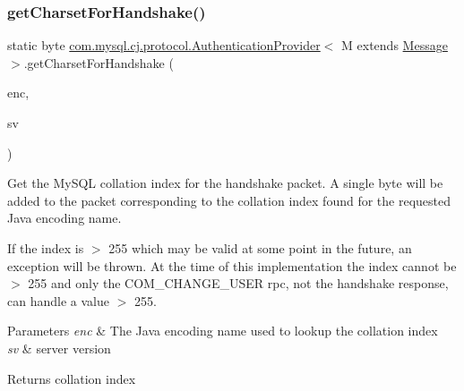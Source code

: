 \subsubsection{\texorpdfstring{get\+Charset\+For\+Handshake()}{getCharsetForHandshake()}}
{\footnotesize\ttfamily static byte \mbox{\hyperlink{interfacecom_1_1mysql_1_1cj_1_1protocol_1_1_authentication_provider}{com.\+mysql.\+cj.\+protocol.\+Authentication\+Provider}}$<$ M extends \mbox{\hyperlink{interfacecom_1_1mysql_1_1cj_1_1protocol_1_1_message}{Message}} $>$.get\+Charset\+For\+Handshake (\begin{DoxyParamCaption}\item[{String}]{enc,  }\item[{\mbox{\hyperlink{classcom_1_1mysql_1_1cj_1_1_server_version}{Server\+Version}}}]{sv }\end{DoxyParamCaption})\hspace{0.3cm}{\ttfamily [static]}}

Get the My\+S\+QL collation index for the handshake packet. A single byte will be added to the packet corresponding to the collation index found for the requested Java encoding name.

If the index is $>$ 255 which may be valid at some point in the future, an exception will be thrown. At the time of this implementation the index cannot be $>$ 255 and only the C\+O\+M\+\_\+\+C\+H\+A\+N\+G\+E\+\_\+\+U\+S\+ER rpc, not the handshake response, can handle a value $>$ 255.


\begin{DoxyParams}{Parameters}
{\em enc} & The Java encoding name used to lookup the collation index \\
\hline
{\em sv} & server version \\
\hline
\end{DoxyParams}
\begin{DoxyReturn}{Returns}
collation index 
\end{DoxyReturn}
\mbox{\label{interfacecom_1_1mysql_1_1cj_1_1protocol_1_1_authentication_provider_ad030b0dc0784302f1221945aef2ae2e7}} 
